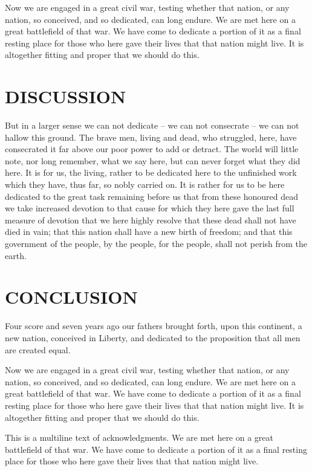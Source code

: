 \documentclass{pasa}%
\begin{document}
Now we are engaged in a great civil war, testing whether that nation, or any nation, so conceived, and so dedicated, can long endure. We are met here on a great battlefield of that war. We have come to dedicate a portion of it as a final resting place for those who here gave their lives that that nation might live. It is altogether fitting and proper that we should do this.

\section{DISCUSSION}
But in a larger sense we can not dedicate -- we can not consecrate -- we can not hallow this ground. The brave men, living and dead, who struggled, here, have consecrated it far above our poor power to add or detract. The world will little note, nor long remember, what we say here, but can never forget what they did here. It is for us, the living, rather to be dedicated here to the unfinished work which they have, thus far, so nobly carried on. It is rather for us to be here dedicated to the great task remaining before us  that from these honoured dead we take increased devotion to that cause for which they here gave the last full measure of devotion  that we here highly resolve that these dead shall not have died in vain; that this nation shall have a new birth of freedom; and that this government of the people, by the people, for the people, shall not perish from the earth.

\section{CONCLUSION}

Four score and seven years ago our fathers brought forth, upon this continent, a new nation, conceived in Liberty, and dedicated to the proposition that all men are created equal.

 
Now we are engaged in a great civil war, testing whether that nation, or any nation, so conceived, and so dedicated, can long endure. We are met here on a great battlefield of that war. We have come to dedicate a portion of it as a final resting place for those who here gave their lives that that nation might live. It is altogether fitting and proper that we should do this.

\begin{acknowledgements}
This is a multiline text of acknowledgments. We are met here on a great battlefield of that war. We have come to dedicate a portion of it as a final resting place for those who here gave their lives that that nation might live.
\end{acknowledgements}
\end{document}

